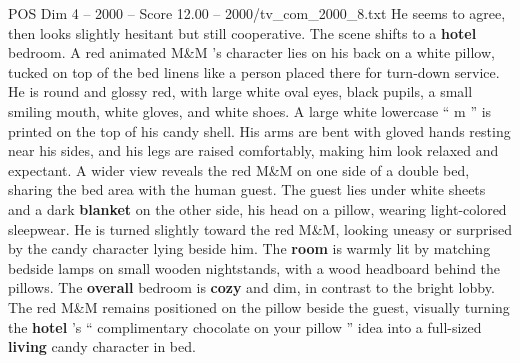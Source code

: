 \begin{textsample}{POS Dim 4 – 2000 – Score 12.00 – 2000/tv\_com\_2000\_8.txt}
He seems to agree, then looks slightly hesitant but still cooperative.
The scene shifts to a \textbf{hotel} bedroom.
A red animated M\&M ’s character lies on his back on a white pillow, tucked on top of the bed linens like a person placed there for turn-down service.
He is round and glossy red, with large white oval eyes, black pupils, a small smiling mouth, white gloves, and white shoes.
A large white lowercase “ m ” is printed on the top of his candy shell.
His arms are bent with gloved hands resting near his sides, and his legs are raised comfortably, making him look relaxed and expectant.
A wider view reveals the red M\&M on one side of a double bed, sharing the bed area with the human guest.
The guest lies under white sheets and a dark \textbf{blanket} on the other side, his head on a pillow, wearing light-colored sleepwear.
He is turned slightly toward the red M\&M, looking uneasy or surprised by the candy character lying beside him.
The \textbf{room} is warmly lit by matching bedside lamps on small wooden nightstands, with a wood headboard behind the pillows.
The \textbf{overall} bedroom is \textbf{cozy} and dim, in contrast to the bright lobby.
The red M\&M remains positioned on the pillow beside the guest, visually turning the \textbf{hotel} ’s “ complimentary chocolate on your pillow ” idea into a full-sized \textbf{living} candy character in bed.

\end{textsample}
